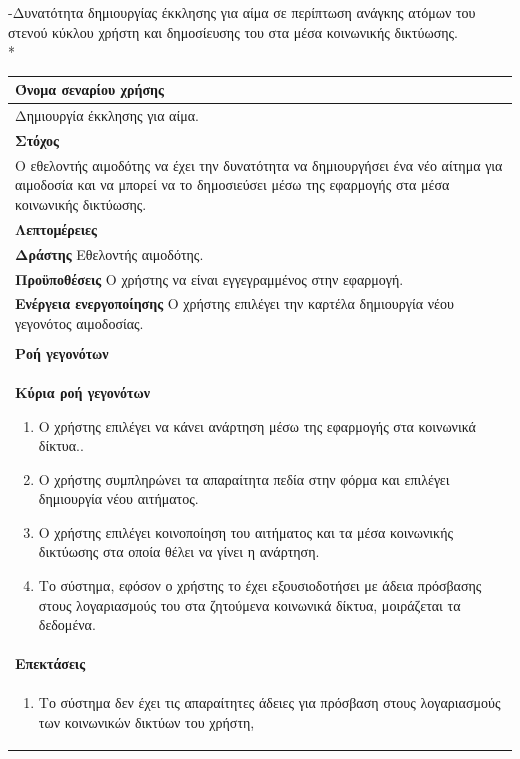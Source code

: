 -Δυνατότητα δημιουργίας έκκλησης για αίμα σε περίπτωση ανάγκης ατόμων του στενού κύκλου χρήστη και δημοσίευσης του στα μέσα κοινωνικής δικτύωσης.
\\*
\begin{table}[H]
	\begin{center}
	    \begin{tabular}{|p{\dimexpr \linewidth-2\tabcolsep}|}
	    \hline
	    \rowcolor{grayy}
	    \textbf{Όνομα σεναρίου χρήσης}
	    \\ \hline    
	    Δημιουργία έκκλησης για αίμα.
	     \\ \hline
	    \rowcolor{grayy}
	    \textbf{\textbf{Στόχος}}
	    \\ \hline
	 	 Ο εθελοντής αιμοδότης να έχει την δυνατότητα να δημιουργήσει ένα νέο αίτημα για αιμοδοσία και να μπορεί να το δημοσιεύσει μέσω της εφαρμογής στα μέσα κοινωνικής δικτύωσης.
	    \\ \hline
	    \rowcolor{grayy}
	    \textbf{Λεπτομέρειες}
	    \\ \hline
		\textbf{Δράστης} Εθελοντής αιμοδότης.
		\\*
		\textbf{Προϋποθέσεις} Ο χρήστης να είναι εγγεγραμμένος στην εφαρμογή.
		\\*
		\textbf{Ενέργεια ενεργοποίησης} Ο χρήστης επιλέγει την καρτέλα δημιουργία νέου γεγονότος αιμοδοσίας.
		\\ \hline
	    \\ \hline
		\rowcolor{grayy}    
	    \textbf{Ροή γεγονότων}
	    \\* 
		\textbf{Κύρια ροή γεγονότων}
		\begin{enumerate}
		\item	 Ο χρήστης επιλέγει να κάνει ανάρτηση μέσω της εφαρμογής  στα κοινωνικά δίκτυα..
		\item Ο χρήστης συμπληρώνει τα απαραίτητα πεδία στην φόρμα και επιλέγει δημιουργία νέου αιτήματος.
		\item Ο χρήστης επιλέγει κοινοποίηση του αιτήματος και τα μέσα κοινωνικής δικτύωσης στα οποία θέλει να γίνει η ανάρτηση.
	   \item Το σύστημα, εφόσον ο χρήστης το έχει εξουσιοδοτήσει με άδεια πρόσβασης στους λογαριασμούς του στα ζητούμενα κοινωνικά δίκτυα, μοιράζεται τα δεδομένα.
		\end{enumerate}
		\\*
		\textbf{Επεκτάσεις}
		   \\ \hline
		\begin{enumerate}
			\item Το σύστημα δεν έχει τις απαραίτητες άδειες για πρόσβαση στους λογαριασμούς των κοινωνικών δικτύων του χρήστη,

\end{enumerate}
\end{tabular}
\end{center}
\end{table}
